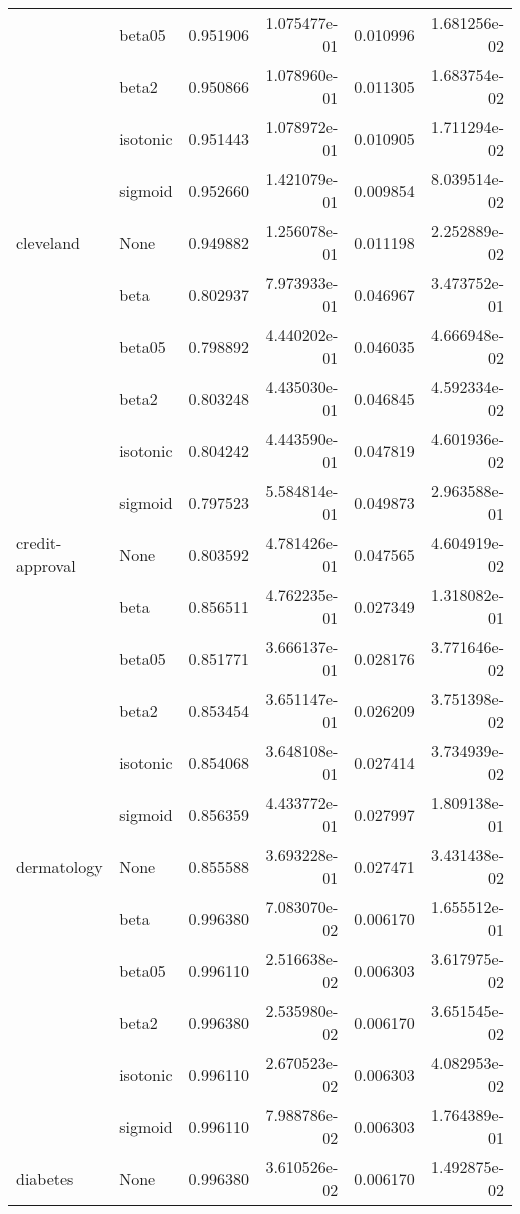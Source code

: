 \begin{tabular}{llrrrr}
        & beta05 &  0.951906 &  1.075477e-01 &  0.010996 &  1.681256e-02 \\
        & beta2 &  0.950866 &  1.078960e-01 &  0.011305 &  1.683754e-02 \\
        & isotonic &  0.951443 &  1.078972e-01 &  0.010905 &  1.711294e-02 \\
        & sigmoid &  0.952660 &  1.421079e-01 &  0.009854 &  8.039514e-02 \\
cleveland & None &  0.949882 &  1.256078e-01 &  0.011198 &  2.252889e-02 \\
        & beta &  0.802937 &  7.973933e-01 &  0.046967 &  3.473752e-01 \\
        & beta05 &  0.798892 &  4.440202e-01 &  0.046035 &  4.666948e-02 \\
        & beta2 &  0.803248 &  4.435030e-01 &  0.046845 &  4.592334e-02 \\
        & isotonic &  0.804242 &  4.443590e-01 &  0.047819 &  4.601936e-02 \\
        & sigmoid &  0.797523 &  5.584814e-01 &  0.049873 &  2.963588e-01 \\
credit-approval & None &  0.803592 &  4.781426e-01 &  0.047565 &  4.604919e-02 \\
        & beta &  0.856511 &  4.762235e-01 &  0.027349 &  1.318082e-01 \\
        & beta05 &  0.851771 &  3.666137e-01 &  0.028176 &  3.771646e-02 \\
        & beta2 &  0.853454 &  3.651147e-01 &  0.026209 &  3.751398e-02 \\
        & isotonic &  0.854068 &  3.648108e-01 &  0.027414 &  3.734939e-02 \\
        & sigmoid &  0.856359 &  4.433772e-01 &  0.027997 &  1.809138e-01 \\
dermatology & None &  0.855588 &  3.693228e-01 &  0.027471 &  3.431438e-02 \\
        & beta &  0.996380 &  7.083070e-02 &  0.006170 &  1.655512e-01 \\
        & beta05 &  0.996110 &  2.516638e-02 &  0.006303 &  3.617975e-02 \\
        & beta2 &  0.996380 &  2.535980e-02 &  0.006170 &  3.651545e-02 \\
        & isotonic &  0.996110 &  2.670523e-02 &  0.006303 &  4.082953e-02 \\
        & sigmoid &  0.996110 &  7.988786e-02 &  0.006303 &  1.764389e-01 \\
diabetes & None &  0.996380 &  3.610526e-02 &  0.006170 &  1.492875e-02 \\

\end{tabular}
